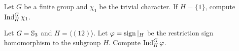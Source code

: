 \begin{exercise}
    Let $G$ be a finite group and $\chi_1$ be
    the trivial character. If $H=\{1\}$, compute
    $\operatorname{Ind}_H^G\chi_1$. 
\end{exercise}

\begin{exercise}
    Let $G=\mathbb{S}_3$ and $H=\langle (12)\rangle$. 
    Let $\varphi=\operatorname{sign}|_H$ be the restriction sign homomorphism 
    to the subgroup $H$. Compute 
    $\operatorname{Ind}_H^G\varphi$. 
\end{exercise}



